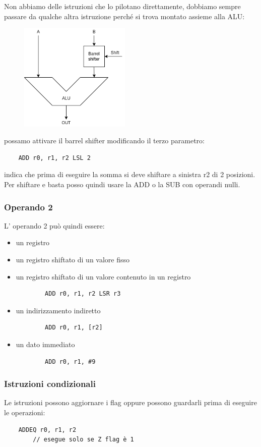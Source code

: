Non abbiamo delle istruzioni che lo pilotano direttamente, dobbiamo sempre passare da qualche altra istruzione perché si trova montato assieme alla ALU:
\begin{figure}
    \centering
    \includegraphics[width=200px]{images/31_ARM/ARM_ALU.png}
\end{figure}
possamo attivare il barrel shifter modificando il terzo parametro:
\begin{verbatim}
    ADD r0, r1, r2 LSL 2
\end{verbatim}
indica che prima di eseguire la somma si deve shiftare a sinistra r2 di 2 posizioni.
Per shiftare e basta posso quindi usare la ADD o la SUB con operandi nulli.

\subsubsection{Operando 2}
L' operando 2 può quindi essere:
\begin{itemize}
    \item un registro
    \item un registro shiftato di un valore fisso
    \item un registro shiftato di un valore contenuto in un registro
    \begin{verbatim}
        ADD r0, r1, r2 LSR r3
    \end{verbatim}
    \item un indirizzamento indiretto
    \begin{verbatim}
        ADD r0, r1, [r2]
    \end{verbatim}
    \item un dato immediato
    \begin{verbatim}
        ADD r0, r1, #9
    \end{verbatim}
\end{itemize}

\subsubsection{Istruzioni condizionali}
Le istruzioni possono aggiornare i flag oppure possono guardarli prima di eseguire le operazioni:
\begin{verbatim}
    ADDEQ r0, r1, r2
        // esegue solo se Z flag è 1
\end{verbatim}

